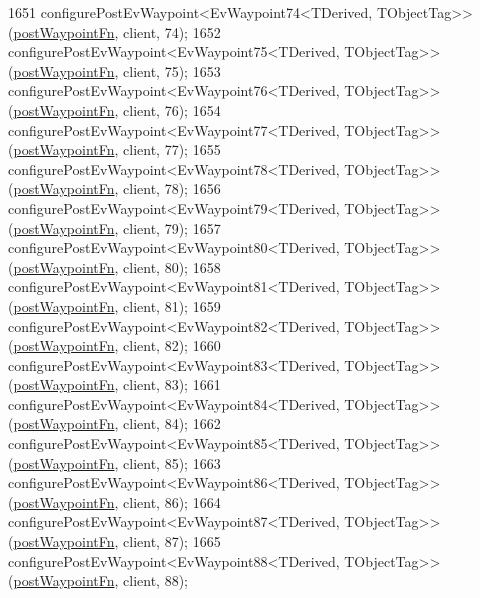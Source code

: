 \begin{DoxyCode}
1651     configurePostEvWaypoint<EvWaypoint74<TDerived, TObjectTag>>(\hyperlink{classsmacc_1_1WaypointEventDispatcher_a6bccf6a93a827634b7b5e67ac0e4ec57}{postWaypointFn}, client, 74);
1652     configurePostEvWaypoint<EvWaypoint75<TDerived, TObjectTag>>(\hyperlink{classsmacc_1_1WaypointEventDispatcher_a6bccf6a93a827634b7b5e67ac0e4ec57}{postWaypointFn}, client, 75);
1653     configurePostEvWaypoint<EvWaypoint76<TDerived, TObjectTag>>(\hyperlink{classsmacc_1_1WaypointEventDispatcher_a6bccf6a93a827634b7b5e67ac0e4ec57}{postWaypointFn}, client, 76);
1654     configurePostEvWaypoint<EvWaypoint77<TDerived, TObjectTag>>(\hyperlink{classsmacc_1_1WaypointEventDispatcher_a6bccf6a93a827634b7b5e67ac0e4ec57}{postWaypointFn}, client, 77);
1655     configurePostEvWaypoint<EvWaypoint78<TDerived, TObjectTag>>(\hyperlink{classsmacc_1_1WaypointEventDispatcher_a6bccf6a93a827634b7b5e67ac0e4ec57}{postWaypointFn}, client, 78);
1656     configurePostEvWaypoint<EvWaypoint79<TDerived, TObjectTag>>(\hyperlink{classsmacc_1_1WaypointEventDispatcher_a6bccf6a93a827634b7b5e67ac0e4ec57}{postWaypointFn}, client, 79);
1657     configurePostEvWaypoint<EvWaypoint80<TDerived, TObjectTag>>(\hyperlink{classsmacc_1_1WaypointEventDispatcher_a6bccf6a93a827634b7b5e67ac0e4ec57}{postWaypointFn}, client, 80);
1658     configurePostEvWaypoint<EvWaypoint81<TDerived, TObjectTag>>(\hyperlink{classsmacc_1_1WaypointEventDispatcher_a6bccf6a93a827634b7b5e67ac0e4ec57}{postWaypointFn}, client, 81);
1659     configurePostEvWaypoint<EvWaypoint82<TDerived, TObjectTag>>(\hyperlink{classsmacc_1_1WaypointEventDispatcher_a6bccf6a93a827634b7b5e67ac0e4ec57}{postWaypointFn}, client, 82);
1660     configurePostEvWaypoint<EvWaypoint83<TDerived, TObjectTag>>(\hyperlink{classsmacc_1_1WaypointEventDispatcher_a6bccf6a93a827634b7b5e67ac0e4ec57}{postWaypointFn}, client, 83);
1661     configurePostEvWaypoint<EvWaypoint84<TDerived, TObjectTag>>(\hyperlink{classsmacc_1_1WaypointEventDispatcher_a6bccf6a93a827634b7b5e67ac0e4ec57}{postWaypointFn}, client, 84);
1662     configurePostEvWaypoint<EvWaypoint85<TDerived, TObjectTag>>(\hyperlink{classsmacc_1_1WaypointEventDispatcher_a6bccf6a93a827634b7b5e67ac0e4ec57}{postWaypointFn}, client, 85);
1663     configurePostEvWaypoint<EvWaypoint86<TDerived, TObjectTag>>(\hyperlink{classsmacc_1_1WaypointEventDispatcher_a6bccf6a93a827634b7b5e67ac0e4ec57}{postWaypointFn}, client, 86);
1664     configurePostEvWaypoint<EvWaypoint87<TDerived, TObjectTag>>(\hyperlink{classsmacc_1_1WaypointEventDispatcher_a6bccf6a93a827634b7b5e67ac0e4ec57}{postWaypointFn}, client, 87);
1665     configurePostEvWaypoint<EvWaypoint88<TDerived, TObjectTag>>(\hyperlink{classsmacc_1_1WaypointEventDispatcher_a6bccf6a93a827634b7b5e67ac0e4ec57}{postWaypointFn}, client, 88);

\end{DoxyCode}
